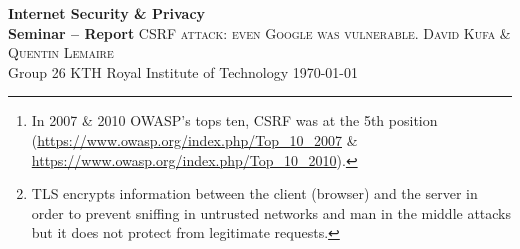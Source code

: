 \documentclass[a4paper,11pt,openany]{report}
\newcommand{\csrf}{\textit{Cross-Site Request Forgery}}
\begin{document}
 \begin{titlepage}
  \centering
  \vfill
    {\bfseries\Large{
	Internet Security \& Privacy\\
	Seminar -- Report}
    }    
  \vfill
  \vfill
    \Huge{\textsc{CSRF attack: even Google was vulnerable.}}
  \vfill
      \Large{\textsc{David Kufa} \& \textsc{Quentin Lemaire}}
    \\
  \vspace{0.4cm}
    Group 26
  \vfill
  \vfill
    KTH Royal Institute of Technology
  \vfill
    \today
\end{titlepage}

\begin{abstract}
  \csrf{} (CSRF) -- often spelled ``sea surf'' -- is a well-known web attack which was 
  discovered in 2001. The \textit{Open Web Application Security Project} (OWASP \cite{owasp}) 
  ranked CSRF as the 8th\footnote{In 2007 \& 2010 OWASP's tops ten, CSRF was at the 5th position 
  (\url{https://www.owasp.org/index.php/Top_10_2007} \& \url{https://www.owasp.org/index.php/Top_10_2010}).} 
  vulnerability in the top 10 of the most critical web application security risks in 2013~\cite{owasp_top_ten}.
  
  CSRF attacks consists of creating (forging) fake HTTP or HTTPS\footnote{TLS encrypts 
  information between the client (browser) and the server in order to prevent sniffing 
  in untrusted networks and man in the middle attacks but it does not protect from 
  legitimate requests.} requests on the user's behalf. It utilizes the lack of knowledge 
  of the victim to build the request and get information with their credentials (as if 
  the user really wanted to execute this request). In order to succeed, the victim must 
  be connected (authenticated) to the service (website) where the vulnerability is located. 
  Then, an attacker will have to fool the victim in order to build the fake request (with 
  social engineering for instance).
  
  During this seminar we wanted to get a better understanding of the security breaches 
  involved in CSRF attack. Our first and most interesting part was the comprehension of 
  the surface of attack: how can it be done and where does it come from. It 
  was also important to understand what kind of information an attacker could steal or 
  affect on the user's behalf thanks to this attack. Furthermore, it was relevant to study 
  different ways of detecting the vulnerability and how to protect web servers from this 
  attack.
  

\end{abstract}
\end{document}
